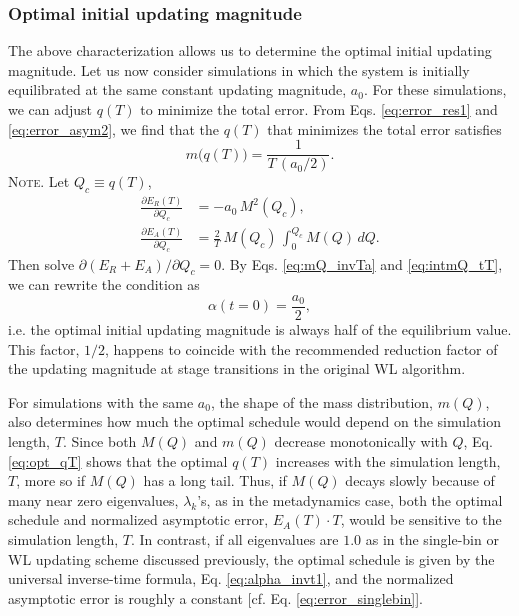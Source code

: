 \documentclass[reprint, superscriptaddress, floatfix]{revtex4-1}
\newcommand{\note}[1]{{\color{DarkGreen}\footnotesize \textsc{Note.} #1}}
\newcommand{\Err}{E}
\begin{document}
\subsubsection{\label{sec:optinitalpha}
  Optimal initial updating magnitude
}


The above characterization allows us to determine
the optimal initial updating magnitude.
%
Let us now consider simulations in which
the system is initially equilibrated at the same
constant updating magnitude, $a_0$.
%
For these simulations,
we can adjust $q(T)$
to minimize the total error.
%
From Eqs. \eqref{eq:error_res1}
and \eqref{eq:error_asym2},
we find that
the $q(T)$ that minimizes
the total error satisfies
\begin{equation}
  m\bigl( q(T) \bigr)
  =
  \frac{1} { T \, (a_0 / 2) }
  .
\label{eq:opt_qT}
\end{equation}
%
\note{Let $Q_c \equiv q(T)$,
$$
\begin{aligned}
  \frac{
    \partial \Err_R(T)
  }
  {
    \partial Q_c
  }
  &=
  -a_0 \, M^2(Q_c)
  ,
  \\
  \frac{
    \partial \Err_A(T)
  }
  {
    \partial Q_c
  }
  &=
  \frac 2 T \,
  M(Q_c) \,
  \int_0^{ Q_c } M(Q) \, dQ
  .
\end{aligned}
$$
Then solve $\partial (\Err_R + \Err_A) / \partial Q_c = 0$.
}%
By Eqs. \eqref{eq:mQ_invTa} and \eqref{eq:intmQ_tT},
we can rewrite the condition as
\begin{equation}
  \alpha( t = 0 )
  =
  \frac{ a_0 }
       { 2 }
  ,
\label{eq:half_alpha0}
\end{equation}
%
i.e. the optimal initial updating magnitude
is always half of the equilibrium value.
%
This factor, $1/2$,
happens to coincide with the
recommended reduction factor of the updating magnitude
at stage transitions
in the original WL algorithm\cite{
wang2001, *wang2001pre}.


For simulations with the same $a_0$,
the shape of the mass distribution, $m(Q)$,
also determines how much the optimal schedule
would depend on the simulation length, $T$.
%
Since both $M(Q)$ and $m(Q)$ decrease monotonically with $Q$,
Eq. \eqref{eq:opt_qT} shows that
the optimal $q(T)$ increases with
the simulation length, $T$,
more so if $M(Q)$ has a long tail.
%
Thus, if $M(Q)$ decays slowly because of
many near zero eigenvalues, $\lambda_k$'s,
as in the metadynamics case,
both the optimal schedule and
normalized asymptotic error, $\Err_A(T) \cdot T$,
would be sensitive to the simulation length, $T$.
%
In contrast, if all eigenvalues are $1.0$
as in the single-bin or WL updating scheme discussed previously,
the optimal schedule is
given by the universal inverse-time formula,
Eq. \eqref{eq:alpha_invt1},
and the normalized asymptotic error
is roughly a constant
[cf. Eq. \eqref{eq:error_singlebin}].
%
\end{document}
